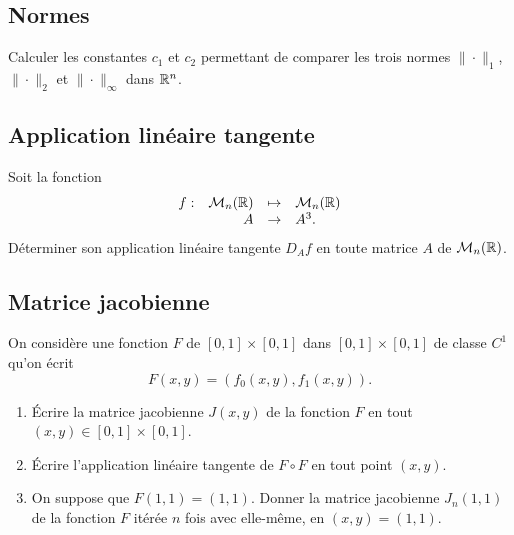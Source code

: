 \subsection{Normes}

\begin{exercise*}
  Calculer les constantes $c_1$ et $c_2$ permettant de comparer les trois normes $\|\cdot\|_1$, $\|\cdot\|_2$ et $\|\cdot\|_\infty$ dans $\mathbb{R}^n$.
\end{exercise*}
\solution{
}

\subsection{Application linéaire tangente}

\begin{exercise} \label{MultiVar-Tangente}
  Soit la fonction
  $$
  \begin{array}{rrcl}
    f :  & \mathcal{M}_n(\mathbb{R}) & \mapsto & \mathcal{M}_n(\mathbb{R}) \\
    & A & \rightarrow & A^3.
  \end{array}
  $$
  Déterminer son application linéaire tangente $D_A f$ en toute matrice $A$ de $\mathcal{M}_n(\mathbb{R})$.
\end{exercise}

\solution{\todo{}}

\subsection{Matrice jacobienne}

\begin{exercise}[Jacobienne] \label{MultiVar-Jacobienne}
  On considère une fonction $F$ de $[0, 1] \times [0, 1]$ dans $[0, 1] \times [0, 1]$ de classe $C^1$ qu'on écrit
  $$
  F(x, y) = (f_0(x, y), f_1(x, y)).
  $$
  \begin{enumerate}
    \item \'Ecrire la matrice jacobienne $J(x, y)$ de la fonction $F$ en tout $(x, y) \in [0, 1] \times [0, 1]$.
    \item \'Ecrire l'application linéaire tangente de $F \circ F$ en tout point $(x, y)$.
    \item On suppose que $F(1, 1) = (1, 1)$. Donner la matrice jacobienne $J_n(1, 1)$ de la fonction $F$ itérée $n$ fois avec elle-même, en $(x, y) = (1, 1)$.
  \end{enumerate}
\end{exercise}

\solution{\todo{}}
